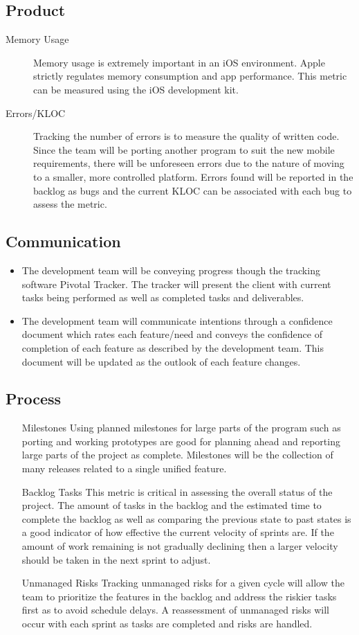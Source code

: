 
\subsection{Product}
\begin{description}
	\item[Memory Usage] Memory usage is extremely important in an iOS environment.  Apple strictly regulates memory consumption and app performance.  This metric can be measured using the iOS development kit.
	\item[Errors/KLOC] Tracking the number of errors is to measure the quality of written code.  Since the team will be porting another program to suit the new mobile requirements, there will be unforeseen errors due to the nature of moving to a smaller, more controlled platform.  Errors found will be reported in the backlog as bugs and the current KLOC can be associated with each bug to assess the metric.
\end{description}

\subsection{Communication}
\begin{itemize}
    \item The development team will be conveying progress though the tracking software Pivotal Tracker.  The tracker will present the client with current tasks being performed as well as completed tasks and deliverables.
    \item The development team will communicate intentions through a confidence document which rates each feature/need and conveys the confidence of completion of each feature as described by the development team.  This document will be updated as the outlook of each feature changes.
\end{itemize}

\subsection{Process}
\begin{itemize}
	\item[Milestones] Using planned milestones for large parts of the program such as porting and working prototypes are good for planning ahead and reporting large parts of the project as complete.  Milestones will be the collection of many releases related to a single unified feature.
	\item[Backlog Tasks] This metric is critical in assessing the overall status of the project.  The amount of tasks in the backlog and the estimated time to complete the backlog as well as comparing the previous state to past states is a good indicator of how effective the current velocity of sprints are.  If the amount of work remaining is not gradually declining then a larger velocity should be taken in the next sprint to adjust.
	\item[Unmanaged Risks]  Tracking unmanaged risks for a given cycle will allow the team to prioritize the features in the backlog and address the riskier tasks first as to avoid schedule delays.  A reassessment of unmanaged risks will occur with each sprint as tasks are completed and risks are handled.
\end{itemize}
